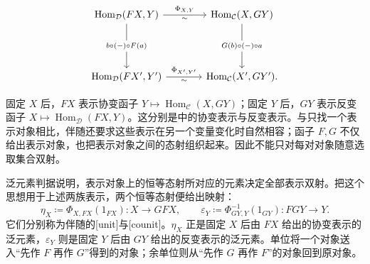 \[
	\begin{tikzcd}[column sep=large,row sep=4.5em]
		\operatorname{Hom}_{\mathcal D}(FX,Y) \arrow[r,"\Phi_{X,Y}","\sim"'] \arrow[d,"b\circ(-)\circ F(a)" description]& \operatorname{Hom}_{\mathcal C}(X,GY) \arrow[d,"G(b)\circ(-)\circ a" description]\\
		\operatorname{Hom}_{\mathcal D}(FX',Y') \arrow[r,"\Phi_{X',Y'}","\sim"']& \operatorname{Hom}_{\mathcal C}(X',GY').
	\end{tikzcd}
\]

固定 \(X\) 后，\(FX\) 表示协变函子 \(Y\mapsto\operatorname{Hom}_{\mathcal C}(X,GY)\)；固定 \(Y\) 后，\(GY\) 表示反变函子 \(X\mapsto\operatorname{Hom}_{\mathcal D}(FX,Y)\)。这分别是中的协变表示与反变表示。与只找一个表示对象相比，伴随还要求这些表示在另一个变量变化时自然相容；函子 \(F,G\) 不仅给出表示对象，也把表示对象之间的态射组织起来。因此不能只对每对对象随意选取集合双射。

\ProseParagraphBreak
泛元素判据说明，表示对象上的恒等态射所对应的元素决定全部表示双射。把这个思想用于上述两族表示，两个恒等态射便给出映射：
\begin{equation}\label{b4:eq:adjunction-unit-counit-def}
	\eta_X\coloneqq\Phi_{X,FX}(1_{FX}):X\longrightarrow GFX, \qquad \varepsilon_Y\coloneqq\Phi^{-1}_{GY,Y}(1_{GY}):FGY\longrightarrow Y.
\end{equation}
它们分别称为伴随的[unit]与[counit]。\(\eta_X\) 正是固定 \(X\) 后由 \(FX\) 给出的协变表示的泛元素，\(\varepsilon_Y\) 则是固定 \(Y\) 后由 \(GY\) 给出的反变表示的泛元素。单位将一个对象送入“先作 \(F\) 再作 \(G\)”得到的对象；余单位则从“先作 \(G\) 再作 \(F\)”的对象回到原对象。

